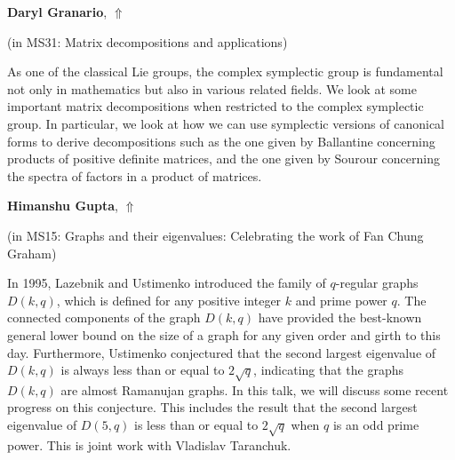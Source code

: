 \documentclass[ILAS2025-program.tex]{subfiles}
\begin{document}
     \hypertarget{down0310}{}\begin{ilasabstract}
    
    \textbf{Daryl Granario},  \hfill \hyperlink{up0310}{$\Uparrow$}
    
    (in {\color{mstitle}MS31: Matrix decompositions and applications})
        
        \mtskip
    As one of the classical Lie groups, the complex symplectic group is fundamental not only in mathematics but also in various related fields. We look at some important matrix decompositions when restricted to the complex symplectic group. In particular, we look at how we can use symplectic versions of canonical forms to derive decompositions such as the one given by Ballantine concerning products of positive definite matrices, and the one given by Sourour concerning the spectra of factors in a product of matrices.
\end{ilasabstract}
     \hypertarget{down0063}{}\begin{ilasabstract}
    
    \textbf{Himanshu Gupta},  \hfill \hyperlink{up0063}{$\Uparrow$}
    
    (in {\color{mstitle}MS15: Graphs and their eigenvalues: Celebrating the work of Fan Chung Graham})
        
        \mtskip
    In 1995, Lazebnik and Ustimenko introduced the family of $q$-regular graphs $D(k, q)$, which is defined for any positive integer $k$ and prime power $q$. The connected components of the graph $D(k, q)$ have provided the best-known general lower bound on the size of a graph for any given order and girth to this day. Furthermore, Ustimenko conjectured that the second largest eigenvalue of $D(k, q)$ is always less than or equal to $2\sqrt{q}$, indicating that the graphs $D(k, q)$ are almost Ramanujan graphs. In this talk, we will discuss some recent progress on this conjecture. This includes the result that the second largest eigenvalue of $D(5, q)$ is less than or equal to $2\sqrt{q}$ when $q$ is an odd prime power. This is joint work with Vladislav Taranchuk.
\end{ilasabstract}
\end{document}
